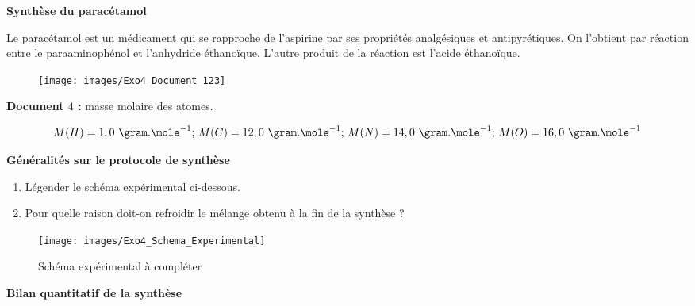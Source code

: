 \exo \textbf{Synthèse du paracétamol}

\vspace{0.3cm}

Le paracétamol est un médicament qui se rapproche de l'aspirine par ses propriétés analgésiques et antipyrétiques. On l'obtient par réaction entre le paraaminophénol et l'anhydride éthanoïque. L'autre produit
de la réaction est l'acide éthanoïque.

\begin{figure}[h]
\begin{center}
\texttt{[image: images/Exo4\_Document\_123]}
\end{center}
\end{figure}

\vspace{0.3cm}

\textbf{Document $4$ :} masse molaire des atomes.

$$M(H) = 1,0\text{ }\gram.\mole^{-1}\text{; }M(C)=12,0\text{ }\gram.\mole^{-1}\text{; }M(N)=14,0\text{ }\gram.\mole^{-1}\text{; }M(O)=16,0\text{ }\gram.\mole^{-1}$$

\vspace{0.3cm}

\textbf{Généralités sur le protocole de synthèse}

\begin{enumerate}
\item Légender le schéma expérimental ci-dessous.
\item Pour quelle raison doit-on refroidir le mélange obtenu à la fin de la synthèse ?
\end{enumerate}

\begin{figure}[h]
\begin{center}
\texttt{[image: images/Exo4\_Schema\_Experimental]}
\caption{\label{fig:Schema_Exp}Schéma expérimental à compléter}
\end{center}
\end{figure}


\newpage

\textbf{Bilan quantitatif de la synthèse}

